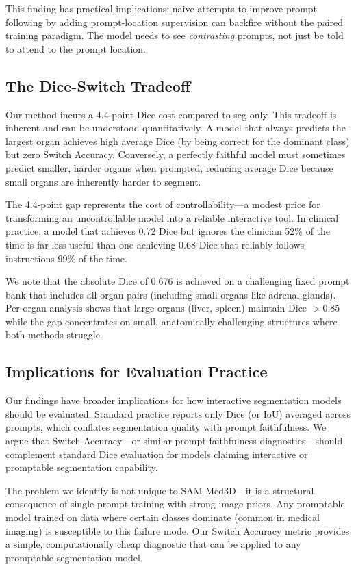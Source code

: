 This finding has practical implications: naive attempts to improve prompt following by adding prompt-location supervision can backfire without the paired training paradigm. The model needs to see \emph{contrasting} prompts, not just be told to attend to the prompt location.

\subsection{The Dice-Switch Tradeoff}

Our method incurs a 4.4-point Dice cost compared to seg-only. This tradeoff is inherent and can be understood quantitatively. A model that always predicts the largest organ achieves high average Dice (by being correct for the dominant class) but zero Switch Accuracy. Conversely, a perfectly faithful model must sometimes predict smaller, harder organs when prompted, reducing average Dice because small organs are inherently harder to segment.

The 4.4-point gap represents the cost of controllability---a modest price for transforming an uncontrollable model into a reliable interactive tool. In clinical practice, a model that achieves 0.72 Dice but ignores the clinician 52\% of the time is far less useful than one achieving 0.68 Dice that reliably follows instructions 99\% of the time.

We note that the absolute Dice of 0.676 is achieved on a challenging fixed prompt bank that includes all organ pairs (including small organs like adrenal glands). Per-organ analysis shows that large organs (liver, spleen) maintain Dice $>$0.85 while the gap concentrates on small, anatomically challenging structures where both methods struggle.

\subsection{Implications for Evaluation Practice}

Our findings have broader implications for how interactive segmentation models should be evaluated. Standard practice reports only Dice (or IoU) averaged across prompts, which conflates segmentation quality with prompt faithfulness. We argue that Switch Accuracy---or similar prompt-faithfulness diagnostics---should complement standard Dice evaluation for models claiming interactive or promptable segmentation capability.

The problem we identify is not unique to SAM-Med3D---it is a structural consequence of single-prompt training with strong image priors. Any promptable model trained on data where certain classes dominate (common in medical imaging) is susceptible to this failure mode. Our Switch Accuracy metric provides a simple, computationally cheap diagnostic that can be applied to any promptable segmentation model.

